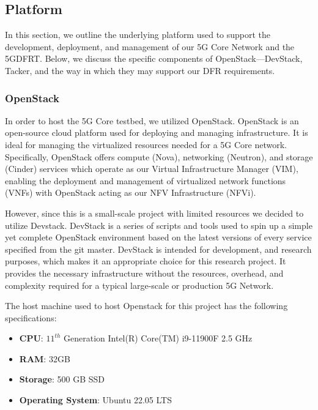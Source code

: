\documentclass[final,1p,times,authoryear]{elsarticle}
\begin{document}
\subsection{Platform}
\label{sub3sec1}
In this section, we outline the underlying platform used to support the development, deployment, and management of our 5G Core Network and the 5GDFRT. Below, we discuss the specific components of OpenStack—DevStack, Tacker, and the way in which they may support our DFR requirements.

\subsubsection{OpenStack}
\label{sub3sub1sec1}
In order to host the 5G Core testbed, we utilized OpenStack. OpenStack is an open-source cloud platform used for deploying and managing infrastructure. It is ideal for managing the virtualized resources needed for a 5G Core network. Specifically, OpenStack offers compute (Nova), networking (Neutron), and storage (Cinder) services which operate as our Virtual Infrastructure Manager (VIM), enabling the deployment and management of virtualized network functions (VNFs) with OpenStack acting as our NFV Infrastructure (NFVi).

\vspace{1em}

However, since this is a small-scale project with limited resources we decided to utilize Devstack. DevStack is a series of scripts and tools used to spin up a simple yet complete OpenStack environment based on the latest versions of every service specified from the git master. DevStack is intended for development, and research purposes, which makes it an appropriate choice for this research project. It provides the necessary infrastructure without the resources, overhead, and complexity required for a typical large-scale or production 5G Network.

\vspace{1em}

The host machine used to host Openstack for this project has the following specifications:

\begin{itemize}
    \item \textbf{CPU}: $11^{th}$ Generation Intel(R) Core(TM) i9-11900F 2.5 GHz
    \item \textbf{RAM}: 32GB
    \item \textbf{Storage}: 500 GB SSD
    \item \textbf{Operating System}: Ubuntu 22.05 LTS
\end{itemize}
\end{document}
